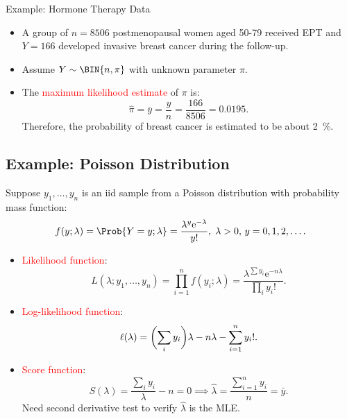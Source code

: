 \documentclass[oneside]{book}\usepackage[]{graphicx}\usepackage[svgnames]{xcolor}
\let\log\relax%
\begin{document}
\begin{Example}{Example: Hormone Therapy Data}
      \begin{itemize}
            \item A group of $ n=8506 $ postmenopausal women aged 50-79 received EPT and $ Y=166 $
                  developed invasive breast cancer during the follow-up.
            \item Assume $ Y \sim \BIN{n,\pi} $ with unknown parameter $ \pi $.
            \item The \textcolor{Red}{maximum likelihood estimate} of $ \pi $ is:
                  \[ \hat{\pi}=\bar{y}=\frac{y}{n} =\frac{166}{8506}=0.0195. \]
                  Therefore, the probability of breast cancer is estimated to be about \qty{2}{\percent}.
      \end{itemize}
\end{Example}
\subsection*{Example: Poisson Distribution}
Suppose $ y_1,\ldots,y_n $ is an iid sample from a Poisson distribution with probability mass function:
\[ f(y;\lambda)=\Prob{Y=y;\lambda}=\frac{\lambda^y \mathrm{e}^{-\lambda}}{y!},\; \lambda>0,\,y=0,1,2,\ldots.  \]
\begin{itemize}
      \item \textcolor{Red}{Likelihood function}:
            \[ L(\lambda;y_1,\ldots,y_n)=\prod_{i=1}^n f(y_i;\lambda)=\frac{\lambda^{\sum y_i}\mathrm{e}^{-n\lambda}}{\prod_i y_i!}.  \]
      \item \textcolor{Red}{Log-likelihood function}:
            \[ \ell(\lambda)=\biggl(\sum_i y_i\biggr)\log{\lambda}-n\lambda-\sum_{i=1}^{n} \log{y_i!}. \]
      \item \textcolor{Red}{Score function}:
            \[ S(\lambda)=\frac{\sum_i y_i}{\lambda}-n=0\implies \hat{\lambda}=\frac{\sum_{i=1}^{n} y_i}{n} =\bar{y}.  \]
            Need second derivative test to verify $ \hat{\lambda} $ is the MLE\@.
\end{itemize}
\end{document}
